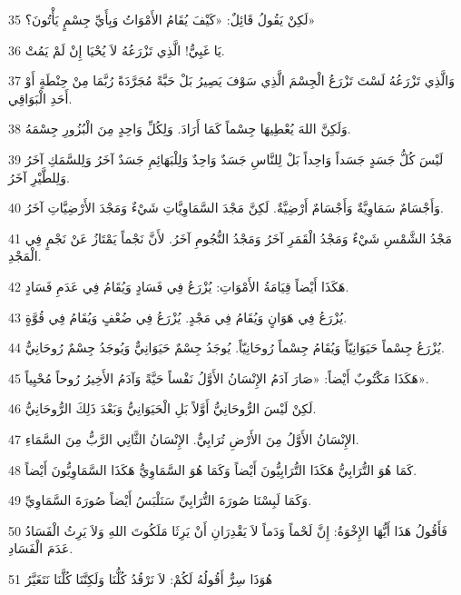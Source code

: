 \par 35 لَكِنْ يَقُولُ قَائِلٌ: «كَيْفَ يُقَامُ الأَمْوَاتُ وَبِأَيِّ جِسْمٍ يَأْتُونَ؟»
\par 36 يَا غَبِيُّ! الَّذِي تَزْرَعُهُ لاَ يُحْيَا إِنْ لَمْ يَمُتْ.
\par 37 وَالَّذِي تَزْرَعُهُ لَسْتَ تَزْرَعُ الْجِسْمَ الَّذِي سَوْفَ يَصِيرُ بَلْ حَبَّةً مُجَرَّدَةً رُبَّمَا مِنْ حِنْطَةٍ أَوْ أَحَدِ الْبَوَاقِي.
\par 38 وَلَكِنَّ اللهَ يُعْطِيهَا جِسْماً كَمَا أَرَادَ. وَلِكُلِّ وَاحِدٍ مِنَ الْبُزُورِ جِسْمَهُ.
\par 39 لَيْسَ كُلُّ جَسَدٍ جَسَداً وَاحِداً بَلْ لِلنَّاسِ جَسَدٌ وَاحِدٌ وَلِلْبَهَائِمِ جَسَدٌ آخَرُ وَلِلسَّمَكِ آخَرُ وَلِلطَّيْرِ آخَرُ.
\par 40 وَأَجْسَامٌ سَمَاوِيَّةٌ وَأَجْسَامٌ أَرْضِيَّةٌ. لَكِنَّ مَجْدَ السَّمَاوِيَّاتِ شَيْءٌ وَمَجْدَ الأَرْضِيَّاتِ آخَرُ.
\par 41 مَجْدُ الشَّمْسِ شَيْءٌ وَمَجْدُ الْقَمَرِ آخَرُ وَمَجْدُ النُّجُومِ آخَرُ. لأَنَّ نَجْماً يَمْتَازُ عَنْ نَجْمٍ فِي الْمَجْدِ.
\par 42 هَكَذَا أَيْضاً قِيَامَةُ الأَمْوَاتِ: يُزْرَعُ فِي فَسَادٍ وَيُقَامُ فِي عَدَمِ فَسَادٍ.
\par 43 يُزْرَعُ فِي هَوَانٍ وَيُقَامُ فِي مَجْدٍ. يُزْرَعُ فِي ضُعْفٍ وَيُقَامُ فِي قُوَّةٍ.
\par 44 يُزْرَعُ جِسْماً حَيَوَانِيّاً وَيُقَامُ جِسْماً رُوحَانِيّاً. يُوجَدُ جِسْمٌ حَيَوَانِيٌّ وَيُوجَدُ جِسْمٌ رُوحَانِيٌّ.
\par 45 هَكَذَا مَكْتُوبٌ أَيْضاً: «صَارَ آدَمُ الإِنْسَانُ الأَوَّلُ نَفْساً حَيَّةً وَآدَمُ الأَخِيرُ رُوحاً مُحْيِياً».
\par 46 لَكِنْ لَيْسَ الرُّوحَانِيُّ أَوَّلاً بَلِ الْحَيَوَانِيُّ وَبَعْدَ ذَلِكَ الرُّوحَانِيُّ.
\par 47 الإِنْسَانُ الأَوَّلُ مِنَ الأَرْضِ تُرَابِيٌّ. الإِنْسَانُ الثَّانِي الرَّبُّ مِنَ السَّمَاءِ.
\par 48 كَمَا هُوَ التُّرَابِيُّ هَكَذَا التُّرَابِيُّونَ أَيْضاً وَكَمَا هُوَ السَّمَاوِيُّ هَكَذَا السَّمَاوِيُّونَ أَيْضاً.
\par 49 وَكَمَا لَبِسْنَا صُورَةَ التُّرَابِيِّ سَنَلْبَسُ أَيْضاً صُورَةَ السَّمَاوِيِّ.
\par 50 فَأَقُولُ هَذَا أَيُّهَا الإِخْوَةُ: إِنَّ لَحْماً وَدَماً لاَ يَقْدِرَانِ أَنْ يَرِثَا مَلَكُوتَ اللهِ وَلاَ يَرِثُ الْفَسَادُ عَدَمَ الْفَسَادِ.
\par 51 هُوَذَا سِرٌّ أَقُولُهُ لَكُمْ: لاَ نَرْقُدُ كُلُّنَا وَلَكِنَّنَا كُلَّنَا نَتَغَيَّرُ
